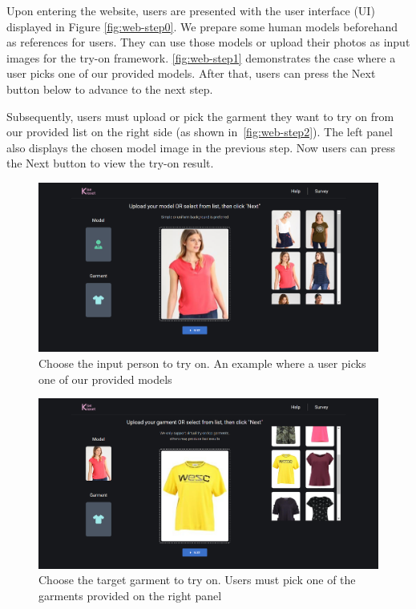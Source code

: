 Upon entering the website, users are presented with the user interface (UI) displayed in Figure \ref{fig:web-step0}. We prepare some human models beforehand as references for users. They can use those models or upload their photos as input images for the try-on framework. \autoref{fig:web-step1} demonstrates the case where a user picks one of our provided models. After that, users can press the Next button below to advance to the next step.

Subsequently, users must upload or pick the garment they want to try on from our provided list on the right side (as shown in~\autoref{fig:web-step2}). The left panel also displays the chosen model image in the previous step. Now users can press the Next button to view the try-on result. 

\begin{figure}[h]
  \centering
  \includegraphics[width=\textwidth]{content/resources/images/application/web-step1.png}
  \caption{Choose the input person to try on. An example where a user picks one of our provided models}
  \label{fig:web-step1}
\end{figure}

\begin{figure}[h!]
  \centering
  \includegraphics[width=\textwidth]{content/resources/images/application/web-step2.png}
  \caption{Choose the target garment to try on. Users must pick one of the garments provided on the right panel}
  \label{fig:web-step2}
\end{figure}

